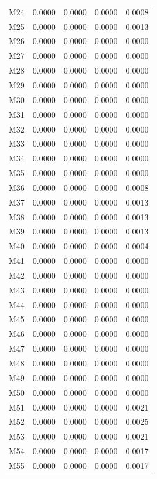 \begin{longtable}{lrrrr}
M24 & 0.0000 & 0.0000 & 0.0000 & 0.0008 \\
M25 & 0.0000 & 0.0000 & 0.0000 & 0.0013 \\
M26 & 0.0000 & 0.0000 & 0.0000 & 0.0000 \\
M27 & 0.0000 & 0.0000 & 0.0000 & 0.0000 \\
M28 & 0.0000 & 0.0000 & 0.0000 & 0.0000 \\
M29 & 0.0000 & 0.0000 & 0.0000 & 0.0000 \\
M30 & 0.0000 & 0.0000 & 0.0000 & 0.0000 \\
M31 & 0.0000 & 0.0000 & 0.0000 & 0.0000 \\
M32 & 0.0000 & 0.0000 & 0.0000 & 0.0000 \\
M33 & 0.0000 & 0.0000 & 0.0000 & 0.0000 \\
M34 & 0.0000 & 0.0000 & 0.0000 & 0.0000 \\
M35 & 0.0000 & 0.0000 & 0.0000 & 0.0000 \\
M36 & 0.0000 & 0.0000 & 0.0000 & 0.0008 \\
M37 & 0.0000 & 0.0000 & 0.0000 & 0.0013 \\
M38 & 0.0000 & 0.0000 & 0.0000 & 0.0013 \\
M39 & 0.0000 & 0.0000 & 0.0000 & 0.0013 \\
M40 & 0.0000 & 0.0000 & 0.0000 & 0.0004 \\
M41 & 0.0000 & 0.0000 & 0.0000 & 0.0000 \\
M42 & 0.0000 & 0.0000 & 0.0000 & 0.0000 \\
M43 & 0.0000 & 0.0000 & 0.0000 & 0.0000 \\
M44 & 0.0000 & 0.0000 & 0.0000 & 0.0000 \\
M45 & 0.0000 & 0.0000 & 0.0000 & 0.0000 \\
M46 & 0.0000 & 0.0000 & 0.0000 & 0.0000 \\
M47 & 0.0000 & 0.0000 & 0.0000 & 0.0000 \\
M48 & 0.0000 & 0.0000 & 0.0000 & 0.0000 \\
M49 & 0.0000 & 0.0000 & 0.0000 & 0.0000 \\
M50 & 0.0000 & 0.0000 & 0.0000 & 0.0000 \\
M51 & 0.0000 & 0.0000 & 0.0000 & 0.0021 \\
M52 & 0.0000 & 0.0000 & 0.0000 & 0.0025 \\
M53 & 0.0000 & 0.0000 & 0.0000 & 0.0021 \\
M54 & 0.0000 & 0.0000 & 0.0000 & 0.0017 \\
M55 & 0.0000 & 0.0000 & 0.0000 & 0.0017 \\

\end{longtable}
